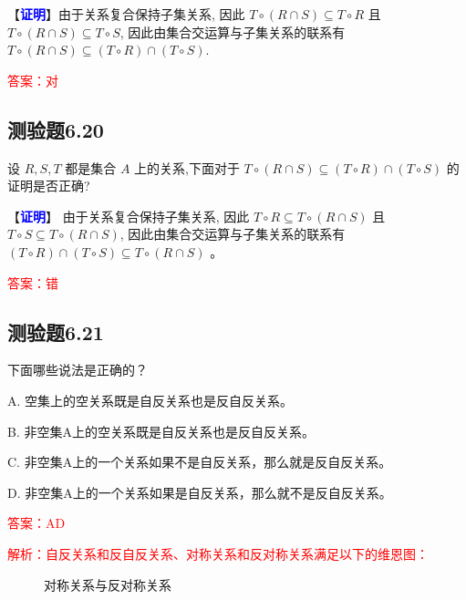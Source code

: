 \documentclass[UTF8, heading=true]{ctexart}
\begin{document}
【\textcolor{blue}{\textbf{证明}}】由于关系复合保持子集关系, 因此 $T \circ(R \cap S) \subseteq T \circ R$ 且 $T \circ(R \cap S) \subseteq T \circ S$, 因此由集合交运算与子集关系的联系有 $T \circ(R \cap S) \subseteq(T \circ R) \cap(T \circ S)$.

\textcolor{red}{答案：对}

\subsection{测验题6.20}
设 $R, S, T$ 都是集合 $A$ 上的关系,下面对于 $T \circ(R \cap S) \subseteq(T \circ R) \cap(T \circ S)$ 的证明是否正确?

【\textcolor{blue}{\textbf{证明}}】 由于关系复合保持子集关系, 因此 $T \circ R \subseteq T \circ(R \cap S)$ 且 $T \circ S \subseteq T \circ(R \cap S)$, 因此由集合交运算与子集关系的联系有 $(T \circ R) \cap(T \circ S) \subseteq T \circ(R \cap S)$ 。

\textcolor{red}{答案：错}

\subsection{测验题6.21}

下面哪些说法是正确的？

A. 空集上的空关系既是自反关系也是反自反关系。

B. 非空集A上的空关系既是自反关系也是反自反关系。

C. 非空集A上的一个关系如果不是自反关系，那么就是反自反关系。

D. 非空集A上的一个关系如果是自反关系，那么就不是反自反关系。

\textcolor{red}{答案：AD}

\textcolor{red}{解析：自反关系和反自反关系、对称关系和反对称关系满足以下的维恩图：}

\begin{figure}[H]
  \centering
  \begin{minipage}{0.45\textwidth}
      \centering
      \caption{自反关系与反自反关系}
  \end{minipage}
  \hspace{0.1cm}
  \begin{minipage}{0.45\textwidth}
      \centering
      \caption{对称关系与反对称关系}
  \end{minipage}
\end{figure}
\end{document}
